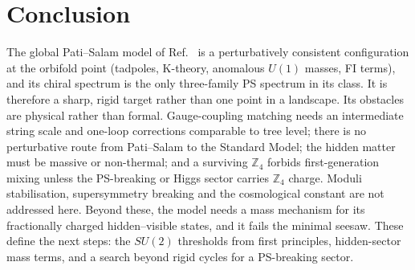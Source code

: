 \documentclass[aps,prd,twocolumn,superscriptaddress,nofootinbib,showkeys]{revtex4-2}
\begin{document}
\section{Conclusion}
The global Pati--Salam model of Ref.~\cite{HRS} is a perturbatively consistent configuration at the orbifold point (tadpoles, K-theory, anomalous $U(1)$ masses, FI terms), and its chiral spectrum is the only three-family PS spectrum in its class. It is therefore a sharp, rigid target rather than one point in a landscape. Its obstacles are physical rather than formal. Gauge-coupling matching needs an intermediate string scale and one-loop corrections comparable to tree level; there is no perturbative route from Pati--Salam to the Standard Model; the hidden matter must be massive or non-thermal; and a surviving $\mathbb Z_4$ forbids first-generation mixing unless the PS-breaking or Higgs sector carries $\mathbb Z_4$ charge. Moduli stabilisation, supersymmetry breaking and the cosmological constant are not addressed here. Beyond these, the model needs a mass mechanism for its fractionally charged hidden--visible states, and it fails the minimal seesaw. These define the next steps: the $SU(2)$ thresholds from first principles, hidden-sector mass terms, and a search beyond rigid cycles for a PS-breaking sector.
\end{document}
